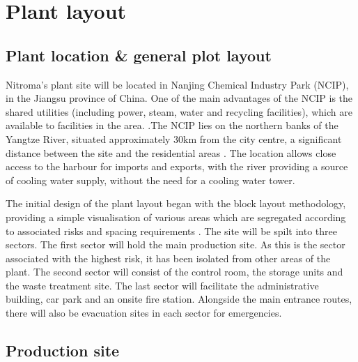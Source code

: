 \section{Plant layout}

\subsection{Plant location \& general plot layout}

Nitroma’s plant site will be located in Nanjing Chemical Industry Park (NCIP), in the Jiangsu province of China. One of the main advantages of the NCIP is the shared utilities (including power, steam, water and recycling facilities), which are available to facilities in the area. \cite{independent_commodity_intelligence_services_china_2007}.The NCIP lies on the northern banks of the Yangtze River, situated approximately 30km from the city centre, a significant distance between the site and the residential areas \cite{zeng_divergent_2011}. The location allows close access to the harbour for imports and exports, with the river providing a source of cooling water supply, without the need for a cooling water tower.    


The initial design of the plant layout began with the block layout methodology, providing a simple visualisation of various areas which are segregated according to associated risks and spacing requirements \cite{center_for_chemical_process_safety_site_2010}. The site will be spilt into three sectors. The first sector will hold the main production site. As this is the sector associated with the highest risk, it has been isolated from other areas of the plant. The second sector will consist of the control room, the storage units and the waste treatment site. The last sector will facilitate the administrative building, car park and an onsite fire station. Alongside the main entrance routes, there will also be evacuation sites in each sector for emergencies. 






\subsection{Production site}

